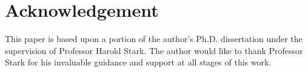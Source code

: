 \documentclass{amsart}
\numberwithin{equation}{section}
\numberwithin{table}{section}
\begin{document}
\section*{Acknowledgement}
This paper is based upon a portion of the author's Ph.D. dissertation under
the supervision of Professor Harold Stark.  The author would like to thank
Professor Stark for his invaluable guidance and support at all stages of this work.



  
\end{document}

